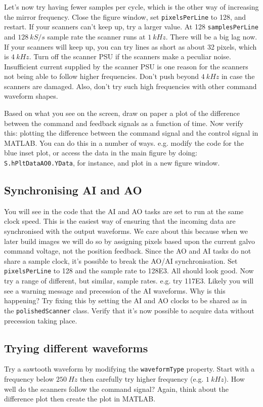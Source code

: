 \documentclass[a4paper]{report}
\begin{document}
Let's now try having fewer samples per cycle, which is the other way of increasing the mirror frequency. 
Close the figure window, set \texttt{pixelsPerLine} to 128, and restart.
If your scanners can't keep up, try a larger value. 
At 128 \texttt{samplesPerLine} and $128~kS/s$ sample rate the scanner runs at $1~kHz$. 
There will be a big lag now. 
If your scanners will keep up, you can try lines as short as about 32 pixels, which is $4~kHz$. 
Turn off the scanner PSU if the scanners make a peculiar noise. 
Insufficient current supplied by the scanner PSU is one reason for the scanners not being able to follow higher frequencies.
Don't push beyond $4~kHz$ in case the scanners are damaged.
Also, don't try such high frequencies with other command waveform shapes.

Based on what you see on the screen, draw on paper a plot of the difference between the command and feedback signals as a function of time.
Now verify this: plotting the difference between the command signal and the control signal in MATLAB.
You can do this in a number of ways. e.g. modify the code for the blue inset plot, or access the data in the main figure by doing:
\texttt{S.hPltDataAO0.YData}, for instance, and plot in a new figure window. 



\subsection{Synchronising AI and AO}
You will see in the code that the AI and AO tasks are set to run at the same clock speed. 
This is the easiest way of ensuring that the incoming data are synchronised with the output waveforms. 
We care about this because when we later build images we will do so by assigning pixels based upon the current galvo command voltage, not the position feedback.
Since the AO and AI tasks do not share a sample clock, it's possible to break the AO/AI synchronisation. 
Set \texttt{pixelsPerLine} to 128 and the sample rate to 128E3. 
All should look good. 
Now try a range of different, but similar, sample rates. e.g. try 117E3. 
Likely you will see a warning message and precession of the AI waveforms. 
Why is this happening?
Try fixing this by setting the AI and AO clocks to be shared as in the \texttt{polishedScanner} class. 
Verify that it's now possible to acquire data without precession taking place.


\subsection{Trying different waveforms}
Try a sawtooth waveform by modifying the \texttt{waveformType} property. 
Start with a frequency below $250~Hz$ then carefully try higher frequency (e.g. $1~kHz$). 
How well do the scanners follow the command signal?
Again, think about the difference plot then create the plot in MATLAB.
\end{document}
